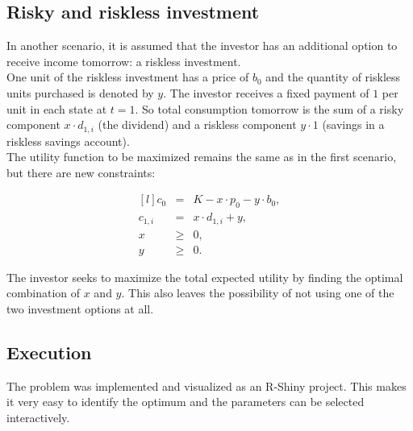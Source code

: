 \bigskip

\subsection{Risky and riskless investment}

\noindent In another scenario, it is assumed that the investor has an additional option to receive income tomorrow: a riskless investment. \\
One unit of the riskless investment has a price of $b_0$ and the quantity of riskless units purchased is denoted by $y$. The investor receives a fixed payment of $1$ per unit in each state at $t=1$. So total consumption tomorrow  is the sum of a risky component $x \cdot d_{1,i}$ (the dividend) and a riskless component $y \cdot 1$ (savings in a riskless savings account). \\

\noindent The utility function to be maximized remains the same as in the first scenario, but there are new constraints:

\begin{equation}\label{eq:scenario2_constraints}
    \begin{matrix*}[l]
        c_0 & = & K - x \cdot p_0 - y \cdot b_0, \\
        c_{1,i} & = & x \cdot d_{1,i} + y,\\
        x & \geq & 0,\\
        y & \geq & 0.
    \end{matrix*}
\end{equation}

\bigskip

\noindent The investor seeks to maximize the total expected utility by finding the optimal combination of $x$ and $y$. This also leaves the possibility of not using one of the two investment options at all.

\bigskip

\subsection{Execution}

\noindent The problem was implemented and visualized as an R-Shiny project. This makes it very easy to identify the optimum and the parameters can be selected interactively.